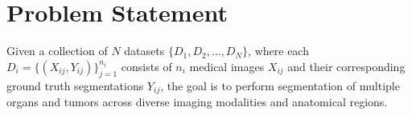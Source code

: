 \documentclass{cls/iutbscthesis}
\begin{document}
\section{Problem Statement}
Given a collection of $N$ datasets $\{D_1, D_2, \dots, D_N\}$, where each $D_i = \{(X_{ij}, Y_{ij})\}_{j=1}^{n_i}$ consists of $n_i$ medical images $X_{ij}$ and their corresponding ground truth segmentations $Y_{ij}$, the goal is to perform segmentation of multiple organs and tumors across diverse imaging modalities and anatomical regions.
\end{document}
